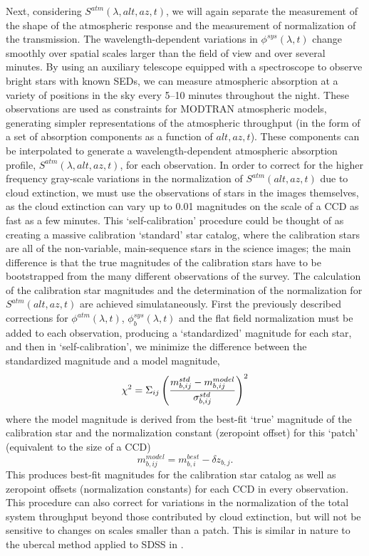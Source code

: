 \documentclass[12pt,preprint]{aastex}
\begin{document}
Next, considering $S^{atm}(\lambda,alt,az,t)$, we will again separate
the measurement of the shape of the atmospheric response and the
measurement of normalization of the transmission.  The
wavelength-dependent variations in $\phi^{sys}(\lambda,t)$ change
smoothly over spatial scales larger than the field of view and over
several minutes.  By using an auxiliary telescope equipped with a
spectroscope to observe bright stars with known SEDs, we can measure
atmospheric absorption at a variety of positions in the sky every
5--10 minutes throughout the night. These observations are used as
constraints for MODTRAN atmospheric models, generating simpler
representations of the atmospheric throughput (in the form of a set of
absorption components as a function of $alt,az,t$). These components
can be interpolated to generate a wavelength-dependent atmospheric
absorption profile, $S^{atm}(\lambda,alt,az,t)$, for each
observation. In order to correct for the higher frequency gray-scale
variations in the normalization of $S^{atm}(alt,az,t)$ due to cloud
extinction, we must use the observations of stars in the images
themselves, as the cloud extinction can vary up to 0.01 magnitudes on
the scale of a CCD \citep{Ivezic2007} as fast as a few minutes. This
`self-calibration' procedure could be thought of as creating a massive
calibration `standard' star catalog, where the calibration stars are
all of the non-variable, main-sequence stars in the science images;
the main difference is that the true magnitudes of the calibration
stars have to be bootstrapped from the many different observations of
the survey. The calculation of the calibration star magnitudes and
the determination of the normalization for $S^{atm}(alt,az,t)$ are
achieved simulataneously. First the previously described corrections
for $\phi^{atm}(\lambda,t)$, $\phi_b^{sys}(\lambda,t)$ and the flat
field normalization must be added to each observation, producing a
`standardized' magnitude for each star, and then in
`self-calibration', we minimize the difference between the
standardized magnitude and a model magnitude,
\begin{equation}
\label{eqn:chi2}
\chi^2 = \Sigma_{ij} \left( { m_{b,ij}^{std} - m_{b,ij}^{model} \over \sigma_{b,ij}^{std} } \right)^2
\end{equation}
where the model magnitude is derived from the best-fit `true'
magnitude of the calibration star and the normalization constant
(zeropoint offset) for this `patch' (equivalent to the size of a CCD)
\begin{equation}
m_{b,ij}^{model} = m_{b,i}^{best} - \delta z_{b,j}.
\end{equation}
This produces best-fit magnitudes for the calibration star catalog as
well as zeropoint offsets (normalization constants) for each CCD in
every observation. This procedure can also correct for variations in
the normalization of the total system throughput beyond those
contributed by cloud extinction, but will not be sensitive to changes
on scales smaller than a patch.  This is similar in nature to the
ubercal method applied to SDSS in \citet{Padmanabhan2008}.
\end{document}
